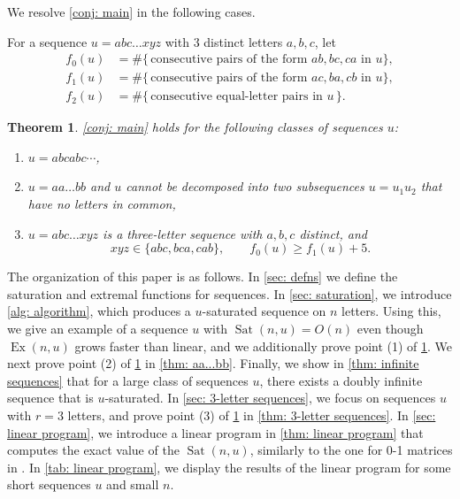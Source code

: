 \documentclass[12pt]{amsart}
\DeclareMathOperator{\Sat}{Sat}
\DeclareMathOperator{\Ex}{Ex}
\newtheorem{thm}{Theorem}
\theoremstyle{definition}
\numberwithin{equation}{section}
\numberwithin{table}{thm}
\begin{document}
We resolve \cref{conj: main} in the following cases. 


For a sequence $u= abc\ldots xyz$ with 3 distinct letters $a,b,c$, let
\begin{align*}
    f_0(u) &= \#\{\,\text{consecutive pairs of the form } ab,bc,ca\text{ in $u$}\}, \\
    f_1(u) &= \#\{\,\text{consecutive pairs of the form } ac,ba,cb\text{ in $u$}\}, \\
    f_2(u) &= \#\{\,\text{consecutive equal-letter pairs in } u\,\}.
\end{align*}

\begin{thm}\label{thm: main}
    \cref{conj: main} holds for the following classes of sequences $u$:
    \begin{enumerate}
        \item $u=abcabc\cdots$,
        \item $u=aa\dots bb$ and $u$ cannot be decomposed into two subsequences $u=u_1u_2$ that have no letters in common,
        \item $u=abc\dots xyz$ is a three-letter sequence with $a,b,c$ distinct, and
        \[xyz\in \{abc,bca,cab\}, \qquad f_0(u)\ge f_1(u)+5.\]
    \end{enumerate}
\end{thm}



The organization of this paper is as follows. In \cref{sec: defns} we define the saturation and extremal functions for sequences. In \cref{sec: saturation}, we introduce \cref{alg: algorithm}, which produces a $u$-saturated sequence on $n$ letters. Using this, we give an example of a sequence $u$ with $\Sat(n,u)=O(n)$ even though $\Ex(n,u)$ grows faster than linear, and we additionally prove point (1) of \cref{thm: main}. 
We next prove point (2) of \cref{thm: main} in \cref{thm: aa...bb}. Finally, we show in \cref{thm: infinite sequences} that for a large class of sequences $u$, there exists a doubly infinite sequence that is $u$-saturated. In \cref{sec: 3-letter sequences}, we focus on sequences $u$ with $r=3$ letters, and prove point (3) of \cref{thm: main} in \cref{thm: 3-letter sequences}. In \cref{sec: linear program}, we introduce a linear program in \cref{thm: linear program} that computes the exact value of the $\Sat(n,u)$, similarly to the one for 0-1 matrices in \cite{brahms01matrices}. In \cref{tab: linear program}, we display the results of the linear program for some short sequences $u$ and small $n$. 
 
\end{document}
